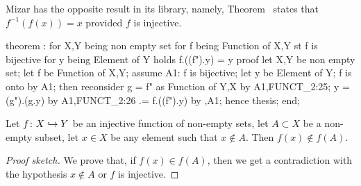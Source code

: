 \begin{thm-remark}
Mizar has the opposite result in its library, namely, Theorem~
states that $f^{-1}(f(x))=x$ provided $f$ is injective.
\end{thm-remark}

\nwenddocs{}\endmoddef\nwstartdeflinemarkup{}\nwenddeflinemarkup
theorem :
  for X,Y being non empty set
  for f being Function of X,Y
  st f is bijective
  for y being Element of Y
  holds f.((f").y) = y
proof
  let X,Y be non empty set;
  let f be Function of X,Y;
  assume A1: f is bijective;
  let y be Element of Y;
  f is onto by A1;
  then reconsider g = f" as Function of Y,X by A1,FUNCT_2:25;
  y = (g").(g.y) by A1,FUNCT_2:26
   .= f.((f").y) by ,A1;
  hence thesis;
end;
\eatline
{}\nwendcode{}\nwdocspar
\begin{theorem}\label{thm:characteristic:preparatory:x-notin-A-implies-fx-notin-fA}
Let $f\colon X\hookrightarrow Y$ be an injective function of non-empty sets, let
$A\subset X$ be a non-empty subset, let $x\in X$ be any element such
that $x\notin A$. Then $f(x)\notin f(A)$.
\end{theorem}

\begin{proof}[Proof sketch]
We prove that, if $f(x)\in f(A)$, then we get a contradiction with the
hypothesis $x\notin A$ or $f$ is injective.
\end{proof}

